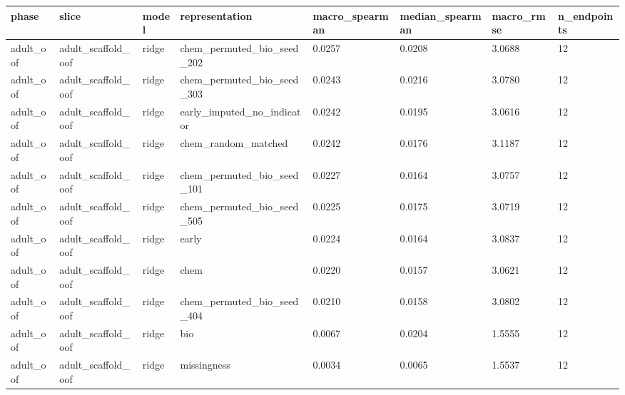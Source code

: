 \begin{tabular}{llllllll}
\hline
phase & slice & model & representation & macro\_spearman & median\_spearman & macro\_rmse & n\_endpoints \\
\hline
adult\_oof & adult\_scaffold\_oof & ridge & chem\_permuted\_bio\_seed\_202 & 0.0257 & 0.0208 & 3.0688 & 12 \\
adult\_oof & adult\_scaffold\_oof & ridge & chem\_permuted\_bio\_seed\_303 & 0.0243 & 0.0216 & 3.0780 & 12 \\
adult\_oof & adult\_scaffold\_oof & ridge & early\_imputed\_no\_indicator & 0.0242 & 0.0195 & 3.0616 & 12 \\
adult\_oof & adult\_scaffold\_oof & ridge & chem\_random\_matched & 0.0242 & 0.0176 & 3.1187 & 12 \\
adult\_oof & adult\_scaffold\_oof & ridge & chem\_permuted\_bio\_seed\_101 & 0.0227 & 0.0164 & 3.0757 & 12 \\
adult\_oof & adult\_scaffold\_oof & ridge & chem\_permuted\_bio\_seed\_505 & 0.0225 & 0.0175 & 3.0719 & 12 \\
adult\_oof & adult\_scaffold\_oof & ridge & early & 0.0224 & 0.0164 & 3.0837 & 12 \\
adult\_oof & adult\_scaffold\_oof & ridge & chem & 0.0220 & 0.0157 & 3.0621 & 12 \\
adult\_oof & adult\_scaffold\_oof & ridge & chem\_permuted\_bio\_seed\_404 & 0.0210 & 0.0158 & 3.0802 & 12 \\
adult\_oof & adult\_scaffold\_oof & ridge & bio & 0.0067 & 0.0204 & 1.5555 & 12 \\
adult\_oof & adult\_scaffold\_oof & ridge & missingness & 0.0034 & 0.0065 & 1.5537 & 12 \\
\hline
\end{tabular}
